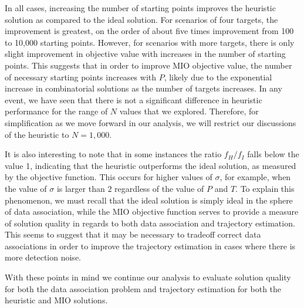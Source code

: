 In all cases, increasing the number of starting points improves the heuristic solution as compared to the ideal solution. For scenarios of four targets, the improvement is greatest, on the order of about five times improvement from 100 to 10,000 starting points. However, for scenarios with more targets, there is only slight improvement in objective value with increases in the number of starting points. This suggests that in order to improve MIO objective value, the number of necessary starting points increases with $P$, likely due to the exponential increase in combinatorial solutions as the number of targets increases. In any event, we have seen that there is not a significant difference in heuristic performance for the range of $N$ values that we explored. Therefore, for simplification as we move forward in our analysis, we will restrict our discussions of the heuristic to $N=1,000$. 

It is also interesting to note that in some instances the ratio $f_{H}/f_{I}$ falls below the value 1, indicating that the heuristic outperforms the ideal solution, as measured by the objective function. This occurs for higher values of $\sigma$, for example, when the value of $\sigma$ is larger than $2$ regardless of the value of $P$ and $T$. To explain this phenomenon, we must recall that the ideal solution is simply ideal in the sphere of data association, while the MIO objective function serves to provide a measure of solution quality in regards to both data association and trajectory estimation. This seems to suggest that it may be necessary to tradeoff correct data associations in order to improve the trajectory estimation in cases where there is more detection noise. 

With these points in mind we continue our analysis to evaluate solution quality for both the data association problem and trajectory estimation for both the heuristic and MIO solutions.

